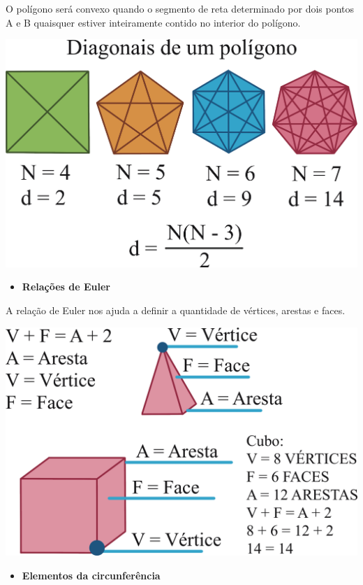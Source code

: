 {O polígono será convexo quando o segmento de reta determinado por dois pontos A e B
quaisquer estiver inteiramente contido no interior do polígono. 

\noindent\includegraphics[width=\textwidth]{./ilustras-mat/modulo_10-poligonos_diagonais.png}

\begin{itemize}
  \item \textbf{Relações de Euler}
\end{itemize}

A relação de Euler nos ajuda a definir a quantidade de vértices, arestas
e faces.

\includegraphics[width=\textwidth]{./ilustras-mat/modulo_10-relacoes_de_euler.png}

\begin{itemize}
  \item \textbf{Elementos da circunferência}
\end{itemize}

}
